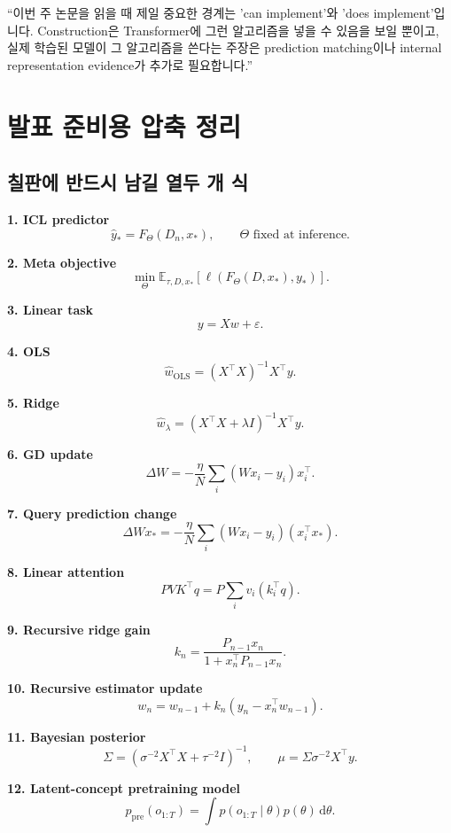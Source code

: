 \documentclass[11pt,a4paper,oneside,openany]{memoir}
\newcommand{\E}{\mathbb{E}}
\newcommand{\dd}{\,\mathrm{d}}
\theoremstyle{definition}
\begin{document}
\begin{presentbox}
``이번 주 논문을 읽을 때 제일 중요한 경계는 'can implement'와 'does implement'입니다. Construction은 Transformer에 그런 알고리즘을 넣을 수 있음을 보일 뿐이고, 실제 학습된 모델이 그 알고리즘을 쓴다는 주장은 prediction matching이나 internal representation evidence가 추가로 필요합니다.''
\end{presentbox}

\chapter{발표 준비용 압축 정리}

\section{칠판에 반드시 남길 열두 개 식}

\textbf{1. ICL predictor}
\[
\hat y_*=F_\Theta(D_n,x_*),
\qquad \Theta\text{ fixed at inference.}
\]

\textbf{2. Meta objective}
\[
\min_\Theta\E_{\tau,D,x_*}
\left[\ell(F_\Theta(D,x_*),y_*)\right].
\]

\textbf{3. Linear task}
\[
y=Xw+\varepsilon.
\]

\textbf{4. OLS}
\[
\hat w_{\mathrm{OLS}}=(X^\top X)^{-1}X^\top y.
\]

\textbf{5. Ridge}
\[
\hat w_\lambda=(X^\top X+\lambda I)^{-1}X^\top y.
\]

\textbf{6. GD update}
\[
\Delta W
=-\frac\eta N\sum_i(Wx_i-y_i)x_i^\top.
\]

\textbf{7. Query prediction change}
\[
\Delta Wx_*
=-\frac\eta N\sum_i(Wx_i-y_i)(x_i^\top x_*).
\]

\textbf{8. Linear attention}
\[
PVK^\top q
=P\sum_i v_i(k_i^\top q).
\]

\textbf{9. Recursive ridge gain}
\[
k_n=\frac{P_{n-1}x_n}{1+x_n^\top P_{n-1}x_n}.
\]

\textbf{10. Recursive estimator update}
\[
w_n=w_{n-1}+k_n(y_n-x_n^\top w_{n-1}).
\]

\textbf{11. Bayesian posterior}
\[
\Sigma=
\left(\sigma^{-2}X^\top X+\tau^{-2}I\right)^{-1},
\qquad
\mu=\Sigma\sigma^{-2}X^\top y.
\]

\textbf{12. Latent-concept pretraining model}
\[
p_{\mathrm{pre}}(o_{1:T})
=\int p(o_{1:T}\mid\theta)p(\theta)\dd\theta.
\]
\end{document}
